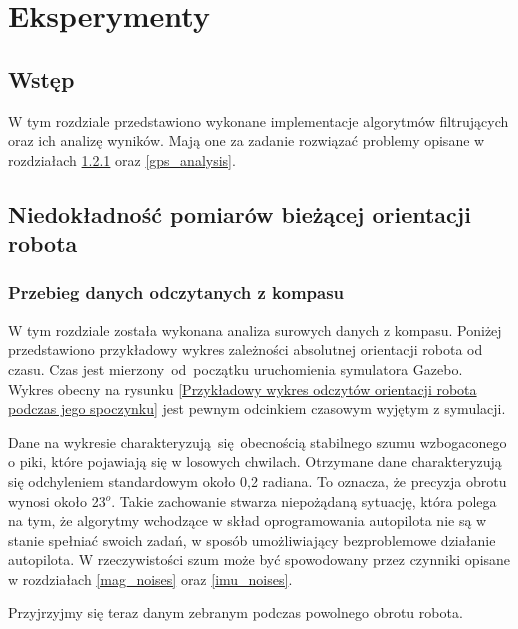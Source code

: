 \newpage
\label{problems}
\section{Eksperymenty}
{
    \subsection{Wstęp}
    {
        W tym rozdziale przedstawiono wykonane implementacje algorytmów filtrujących oraz ich analizę  wyników. Mają one za zadanie rozwiązać problemy opisane w rozdziałach \ref{comapss_data} oraz \ref{gps_analysis}.
    }

    
    \subsection{Niedokładność pomiarów bieżącej orientacji robota}\label{compass_analysis}
    {
        \subsubsection{Przebieg danych odczytanych z kompasu}\label{comapss_data}
        {
            W tym rozdziale została wykonana analiza surowych danych z kompasu. Poniżej przedstawiono przykładowy wykres zależności absolutnej orientacji robota od czasu. Czas jest mierzony~od~początku uruchomienia symulatora Gazebo. Wykres obecny na rysunku \ref{Przykładowy wykres odczytów orientacji robota podczas jego spoczynku} jest pewnym odcinkiem czasowym wyjętym z symulacji.
            

            Dane na wykresie charakteryzują się obecnością stabilnego szumu wzbogaconego o piki, które pojawiają się w losowych chwilach. 
            Otrzymane dane charakteryzują się odchyleniem standardowym około 0,2 radiana. To oznacza, że precyzja obrotu wynosi około 23$^o$. Takie zachowanie stwarza niepożądaną sytuację, która polega na tym, że algorytmy wchodzące w skład oprogramowania autopilota nie są w stanie spełniać swoich zadań, w sposób umożliwiający bezproblemowe działanie autopilota. 
            W rzeczywistości szum może być spowodowany przez czynniki opisane w rozdziałach \ref{mag_noises} oraz \ref{imu_noises}.

            \newpage
            
            Przyjrzyjmy się teraz danym zebranym podczas powolnego obrotu robota.
            
}}}

